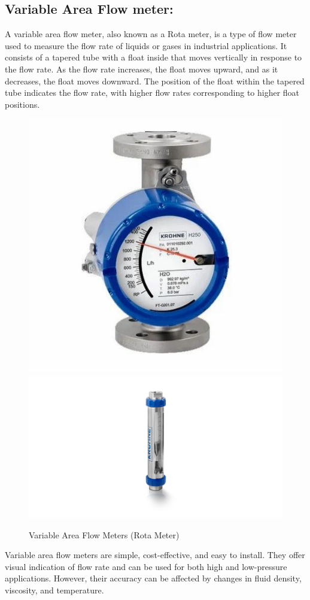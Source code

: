 \subsection{Variable Area Flow meter:}

A variable area flow meter, also known as a Rota meter, is a type of
flow meter used to measure the flow rate of liquids or gases in
industrial applications. It consists of a tapered tube with a float
inside that moves vertically in response to the flow rate. As the flow
rate increases, the float moves upward, and as it decreases, the float
moves downward. The position of the float within the tapered tube
indicates the flow rate, with higher flow rates corresponding to higher
float positions.

\begin{figure}[h!]
    \centering
    \includegraphics[width=0.45\linewidth]{figs/flowmeters/image15.jpg}
    \includegraphics[width=0.8\linewidth]{figs/flowmeters/image16.png}
    \caption{Variable Area Flow Meters (Rota Meter)}
    \label{fig:rota_meter}
\end{figure}


Variable area flow meters are simple, cost-effective, and easy to
install. They offer visual indication of flow rate and can be used for
both high and low-pressure applications. However, their accuracy can be
affected by changes in fluid density, viscosity, and temperature.

